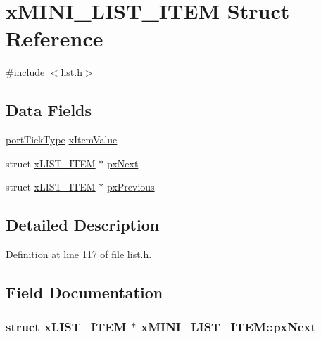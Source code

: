 \hypertarget{structx_m_i_n_i___l_i_s_t___i_t_e_m}{\section{x\-M\-I\-N\-I\-\_\-\-L\-I\-S\-T\-\_\-\-I\-T\-E\-M Struct Reference}
\label{structx_m_i_n_i___l_i_s_t___i_t_e_m}
}


{\ttfamily \#include $<$list.\-h$>$}

\subsection*{Data Fields}
\begin{DoxyCompactItemize}
\item 
\hyperlink{_s_t_m32_f10x_2_libraries_2_free_r_t_o_s_2_source_2portable_2_g_c_c_2_a_r_m___c_m3_2portmacro_8h_a4d746b2ff8fafc490b764c66411ec457}{port\-Tick\-Type} \hyperlink{structx_m_i_n_i___l_i_s_t___i_t_e_m_a368416ac432b0b4596bd64acfa095b19}{x\-Item\-Value}
\item 
struct \hyperlink{structx_l_i_s_t___i_t_e_m}{x\-L\-I\-S\-T\-\_\-\-I\-T\-E\-M} $\ast$ \hyperlink{structx_m_i_n_i___l_i_s_t___i_t_e_m_af9fea5cb465d5adf31761f52158c7492}{px\-Next}
\item 
struct \hyperlink{structx_l_i_s_t___i_t_e_m}{x\-L\-I\-S\-T\-\_\-\-I\-T\-E\-M} $\ast$ \hyperlink{structx_m_i_n_i___l_i_s_t___i_t_e_m_a4d65b08ff0a93fd38b6e3e372065ccd9}{px\-Previous}
\end{DoxyCompactItemize}


\subsection{Detailed Description}


Definition at line 117 of file list.\-h.



\subsection{Field Documentation}
\hypertarget{structx_m_i_n_i___l_i_s_t___i_t_e_m_af9fea5cb465d5adf31761f52158c7492}{
\subsubsection[{px\-Next}]{\setlength{\rightskip}{0pt plus 5cm}struct {\bf x\-L\-I\-S\-T\-\_\-\-I\-T\-E\-M} $\ast$ x\-M\-I\-N\-I\-\_\-\-L\-I\-S\-T\-\_\-\-I\-T\-E\-M\-::px\-Next}}\label{structx_m_i_n_i___l_i_s_t___i_t_e_m_af9fea5cb465d5adf31761f52158c7492}



